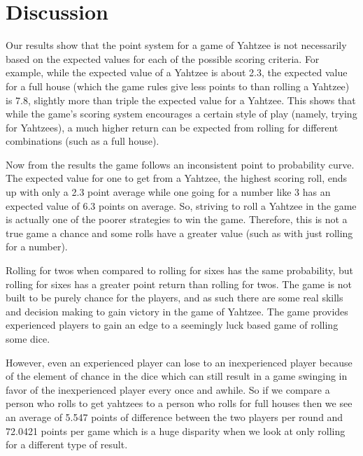 \section{Discussion}

Our results show that the point system for a game of Yahtzee is not necessarily
based on the expected values for each of the possible scoring criteria.
For example, while the expected value of a Yahtzee is about 2.3, the expected
value for a full house (which the game rules give less points to than rolling
a Yahtzee) is 7.8, slightly more than triple the expected value for a Yahtzee.
This shows that while the game's scoring system encourages a certain style of
play (namely, trying for Yahtzees), a much higher return can be expected from
rolling for different combinations (such as a full house).

Now from the results the game follows an inconsistent point to probability curve.
The expected value for one to get from a Yahtzee, the highest scoring roll,
ends up with only a 2.3 point average while one going for a number like 3 has an
expected value of 6.3 points on average. So, striving to roll a Yahtzee in the
game is actually one of the poorer strategies to win the game.  Therefore, this
is not a true game a chance and some rolls have a greater value (such as with
just rolling for a number).

Rolling for twos when compared to rolling for sixes has the same probability,
but rolling for sixes has a greater point return than rolling for twos.  The
game is not built to be purely chance for the players, and as such there are
some real skills and decision making to gain victory in the game of Yahtzee.
The game provides experienced players to gain an edge to a seemingly luck based
game of rolling some dice.

However, even an experienced player can lose to an inexperienced player because
of the element of chance in the dice which can still result in a game swinging
in favor of the inexperienced player every once and awhile.  So if we compare
a person who rolls to get yahtzees to a person who rolls for full houses then we
see an average of 5.547 points of difference between the two players per round
and 72.0421 points per game which is a huge disparity when we look at only
rolling for a different type of result.
